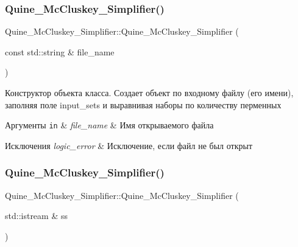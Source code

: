 \subsubsection{\texorpdfstring{Quine\+\_\+\+Mc\+Cluskey\+\_\+\+Simplifier()}{Quine\_McCluskey\_Simplifier()}\hspace{0.1cm}{\footnotesize\ttfamily [2/3]}}
{\footnotesize\ttfamily Quine\+\_\+\+Mc\+Cluskey\+\_\+\+Simplifier\+::\+Quine\+\_\+\+Mc\+Cluskey\+\_\+\+Simplifier (\begin{DoxyParamCaption}\item[{const std\+::string \&}]{file\+\_\+name }\end{DoxyParamCaption})}

Конструктор объекта класса. Создает объект по входному файлу (его имени), заполняя поле input\+\_\+sets и выравнивая наборы по количеству перменных 
\begin{DoxyParams}[1]{Аргументы}
\mbox{\tt in}  & {\em file\+\_\+name} & Имя открываемого файла \\
\hline
\end{DoxyParams}

\begin{DoxyExceptions}{Исключения}
{\em logic\+\_\+error} & Исключение, если файл не был открыт \\
\hline
\end{DoxyExceptions}
\mbox{\label{class_quine___mc_cluskey___simplifier_a018ce5ad2b2a5175f3a26550310817a7}} 
\subsubsection{\texorpdfstring{Quine\+\_\+\+Mc\+Cluskey\+\_\+\+Simplifier()}{Quine\_McCluskey\_Simplifier()}\hspace{0.1cm}{\footnotesize\ttfamily [3/3]}}
{\footnotesize\ttfamily Quine\+\_\+\+Mc\+Cluskey\+\_\+\+Simplifier\+::\+Quine\+\_\+\+Mc\+Cluskey\+\_\+\+Simplifier (\begin{DoxyParamCaption}\item[{std\+::istream \&}]{ss }\end{DoxyParamCaption})}

